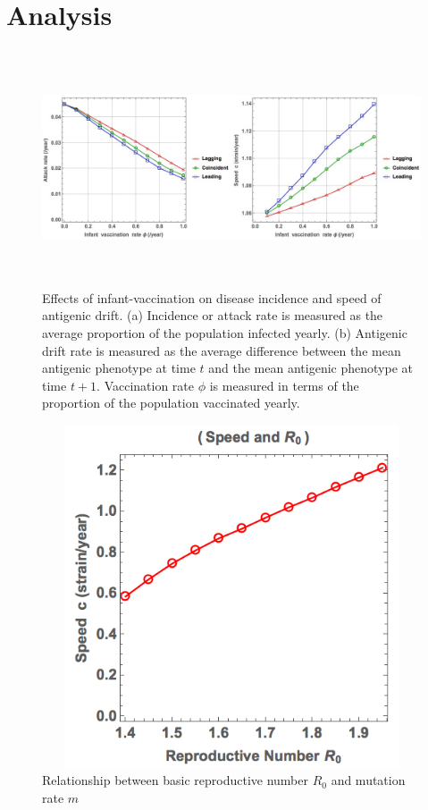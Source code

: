 \documentclass[preprint,12pt]{elsarticle}
\begin{document}
\section{Analysis}
\begin{figure}
  \centering
  \includegraphics[width=6in,height=2.75in]{figures/InfantV}
  \caption{Effects of infant-vaccination on disease incidence and speed of antigenic drift. 
  (a) Incidence or attack rate is measured as the average proportion of the population infected yearly.
  (b) Antigenic drift rate is measured as the average difference between the mean antigenic phenotype at time \(t\) and the mean antigenic phenotype at time \(t+1\).
  Vaccination rate \(\phi\) is measured in terms of the proportion of the population vaccinated yearly.
 }
  \label{fig:Veffect}
\end{figure}



\begin{figure}
  \centering
  \includegraphics[width=6in,height=4in]{figures/SpeedRm}
  \caption{Relationship between basic reproductive number \(R_0\) and mutation rate \(m\)}
  \label{fig:SpeedRm}
\end{figure}
\end{document}
